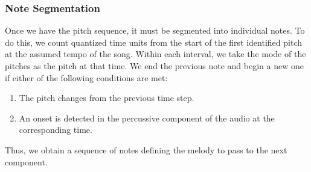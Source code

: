 \subsubsection{Note Segmentation}

Once we have the pitch sequence, it must be segmented into individual notes. To do this, we count quantized time units from the start of the first identified pitch at the assumed tempo of the song. Within each interval, we take the mode of the pitches as the pitch at that time. We end the previous note and begin a new one if either of the following conditions are met:
\begin{enumerate}
    \item The pitch changes from the previous time step.
    \item An onset is detected in the percussive component of the audio at the corresponding time.
\end{enumerate}
Thus, we obtain a sequence of notes defining the melody to pass to the next component.
